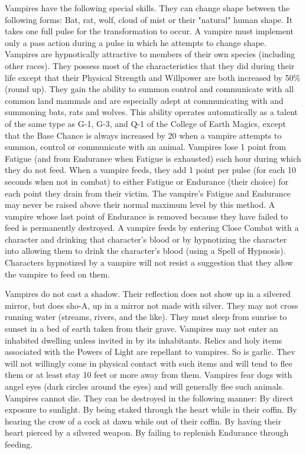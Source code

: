 \begin{multicols*}{2}
\begin{description}
Vampires have the following special skills. They can change shape
between the following forms: Bat, rat, wolf, cloud of mist or their
"natural" human shape. It takes one full pulse for the transformation
to occur. A vampire must implement only a pass action during a pulse
in which he attempts to change shape. Vampires are hypnotically
attractive to members of their own species (including other races).
They possess most of the characteristics that they did during their
life except that their Physical Strength and Willpower are both
increased by 50\% (round up). They gain the ability to summon control
and communicate with all common land mammals and are especially adept
at communicating with and summoning bats, rats and wolves. This
ability operates automatically as a talent of the same type as G-1,
G-3, and Q-1 of the College of Earth Magics, except that the Base
Chance is always increased by 20 when a vampire attempts to summon,
control or communicate with an animal.  Vampires lose 1 point from
Fatigue (and from Endurance when Fatigue is exhausted) each hour
during which they do not feed.  When a vampire feeds, they add 1 point
per pulse (for each 10 seconds when not in combat) to either Fatigue
or Endurance (their choice) for each point they drain from their
victim. The vampire's Fatigue and Endurance may never be raised above
their normal maximum level by this method. A vampire whose last point
of Endurance is removed because they have failed to feed is
permanently destroyed. A vampire feeds by entering Close Combat with a
character and drinking that character's blood or by hypnotizing the
character into allowing them to drink the character's blood (using a
Spell of Hypnosis). Characters hypnotized by a vampire will not resist
a suggestion that they allow the vampire to feed on them.

Vampires do not cast a shadow. Their reflection does not show up in a
silvered mirror, but does sho-A, up in a mirror not made with
silver. They may not cross running water (streams, rivers, and the
like). They must sleep from sunrise to sunset in a bed of earth taken
from their grave. Vampires may not enter an inhabited dwelling unless
invited in by its inhabitants.  Relics and holy items associated with
the Powers of Light are repellant to vampires. So is garlic.  Thev
will not willingly come in physical contact with such items and will
tend to flee them or at least stay 10 feet or more away from them.
Vampires fear dogs with angel eyes (dark circles around the eyes) and
will generally flee such animals.  Vampires cannot die.  They can be
destroyed in the following manner:
 By direct exposure to sunlight.
 By being staked through the heart while in their coffin.
 By hearing the crow of a cock at dawn while out of their coffin.
 By having their heart pierced by a silvered weapon.
 By failing to replenish Endurance through feeding.



\end{description}
\end{multicols*}
